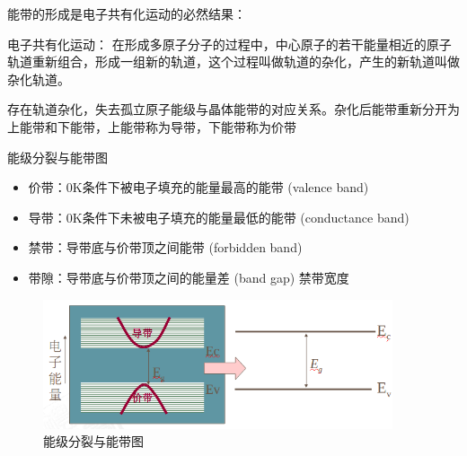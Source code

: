 \documentclass[trans]{beamer} %
\begin{document}
\begin{frame}{能带的形成是电子共有化运动的必然结果：}
    

    \begin{alertblock}{电子共有化运动：}
    在形成多原子分子的过程中，中心原子的若干能量相近的原子轨道重新组合，形成一组新的轨道，这个过程叫做轨道的杂化，产生的新轨道叫做杂化轨道。
    
    存在轨道杂化，失去孤立原子能级与晶体能带的对应关系。杂化后能带重新分开为上能带和下能带，上能带称为\alert{导带}，下能带称为\alert{价带}
    \end{alertblock}
   
 
 \end{frame}
 


\begin{frame}{能级分裂与能带图}
    
    \begin{itemize}
        \item 价带：0K条件下被电子填充的能量最高的能带 (valence band)
        \item 导带：0K条件下未被电子填充的能量最低的能带 (conductance band)
        \item 禁带：导带底与价带顶之间能带 (forbidden band)
        \item 带隙：导带底与价带顶之间的能量差 (band gap)  禁带宽度 
    \end{itemize}
    \begin{figure}[htbp] 
    \centering\includegraphics[height=1.5in]{source/ch2/fg213.png} 
    \caption{能级分裂与能带图}
    \end{figure}  
   
 
 \end{frame}
\end{document}
